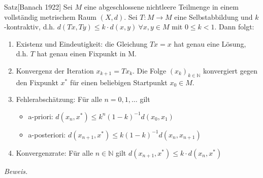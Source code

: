 \documentclass{article}
\begin{document}
\begin{thmbox}{Satz}[Banach 1922]
    Sei $M$ eine abgeschlossene nichtleere Teilmenge in einem vollständig metrischem Raum $(X,d)$. 
    Sei $T:M\rightarrow M$ eine Selbstabbildung und $k$-kontraktiv, d.h. $d(Tx,Ty)\leq k\cdot d(x,y)\ \forall x,y\in M$ 
    mit $0\leq k < 1$. Dann folgt:
    \begin{enumerate}
        \item Existenz und Eindeutigkeit: die Gleichung $Tx=x$ hat genau eine Lösung, d.h. $T$ hat genau einen 
        Fixpunkt in M.
        \item Konvergenz der Iteration $x_{k+1}=Tx_k$. Die Folge $(x_k)_{k\in\mathbb{N}}$ konvergiert gegen den 
        Fixpunkt $x^*$ für einen beliebigen Startpunkt $x_0\in M$.
        \item Fehlerabschätzung: Für alle $n=0,1,\dotsc$ gilt 
        \begin{itemize}
            \item a-priori: $d(x_n,x^*)\leq k^n(1-k)^{-1}d(x_0,x_1)$
            \item a-posteriori: $d(x_{n+1},x^*)\leq k(1-k)^{-1}d(x_n,x_{n+1})$
        \end{itemize}
        \item Konvergenzrate: Für alle $n\in\mathbb{N}$ gilt $d(x_{n+1},x^*)\leq k\cdot d(x_n,x^*)$
    \end{enumerate}
\end{thmbox}
\textit{Beweis.} 
\end{document}
